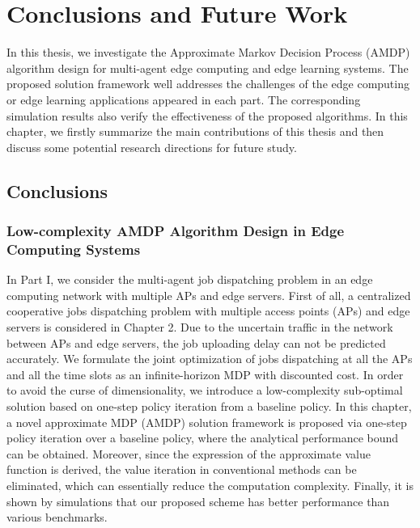 
\chapter{Conclusions and Future Work}
\label{ch4}

In this thesis, we investigate the Approximate Markov Decision Process (AMDP) algorithm design for multi-agent edge computing and edge learning systems.
The proposed solution framework well addresses the challenges of the edge computing or edge learning applications appeared in each part.
The corresponding simulation results also verify the effectiveness of the proposed algorithms.
In this chapter, we firstly summarize the main contributions of this thesis and then discuss some potential research directions for future study.

\section{Conclusions}

\subsection{Low-complexity AMDP Algorithm Design in Edge Computing Systems}
In Part I, we consider the multi-agent job dispatching problem in an edge computing network with multiple APs and edge servers.
First of all, a centralized cooperative jobs dispatching problem with multiple access points (APs) and edge servers is considered in Chapter 2.
Due to the uncertain traffic in the network between APs and edge servers, the job uploading delay can not be predicted accurately.
We formulate the joint optimization of jobs dispatching at all the APs and all the time slots as an infinite-horizon MDP with discounted cost.
In order to avoid the curse of dimensionality, we introduce a low-complexity sub-optimal solution based on one-step policy iteration from a baseline policy.
In this chapter, a novel approximate MDP (AMDP) solution framework is proposed via one-step policy iteration over a baseline policy, where the analytical performance bound can be obtained.
Moreover, since the expression of the approximate value function is derived, the value iteration in conventional methods can be eliminated, which can essentially reduce the computation complexity.
Finally, it is shown by simulations that our proposed scheme has better performance than various benchmarks.

